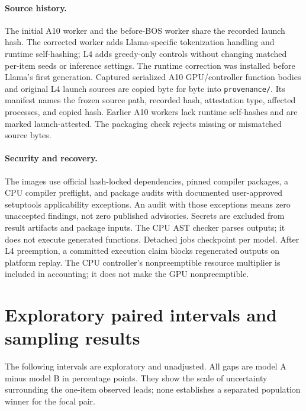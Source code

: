 \documentclass[10pt,twocolumn]{article}
\newcommand{\code}[1]{\texttt{#1}}
\begin{document}
\paragraph{Source history.}
The initial A10 worker and the before-BOS worker share the recorded launch hash. The corrected worker adds Llama-specific tokenization handling and runtime self-hashing; L4 adds greedy-only controls without changing matched per-item seeds or inference settings. The runtime correction was installed before Llama's first generation. Captured serialized A10 GPU/controller function bodies and original L4 launch sources are copied byte for byte into \code{provenance/}. Its manifest names the frozen source path, recorded hash, attestation type, affected processes, and copied hash. Earlier A10 workers lack runtime self-hashes and are marked launch-attested. The packaging check rejects missing or mismatched source bytes.

\paragraph{Security and recovery.}
The images use official hash-locked dependencies, pinned compiler packages, a CPU compiler preflight, and package audits with documented user-approved setuptools applicability exceptions. An audit with those exceptions means zero unaccepted findings, not zero published advisories. Secrets are excluded from result artifacts and package inputs. The CPU AST checker parses outputs; it does not execute generated functions. Detached jobs checkpoint per model. After L4 preemption, a committed execution claim blocks regenerated outputs on platform replay. The CPU controller's nonpreemptible resource multiplier is included in accounting; it does not make the GPU nonpreemptible.

\FloatBarrier
\section{Exploratory paired intervals and sampling results}\label{app:intervals}
The following intervals are exploratory and unadjusted. All gaps are model A minus model B in percentage points. They show the scale of uncertainty surrounding the one-item observed leads; none establishes a separated population winner for the focal pair.
\begin{table}[h]\centering\scriptsize

\caption{Saved exploratory 95\% paired item-bootstrap gap intervals. No intervals were recomputed for this manuscript.}
\end{table}
\begin{table}[t]\centering\small

\caption{Saved A10 sampling scores. pass@1 intervals are exploratory 95\% item-bootstrap intervals; pass@5 and pass@10 point estimates use the unbiased estimator. Timing repetitions and L4 greedy outputs do not add independent sampling observations.}
\end{table}
\end{document}
